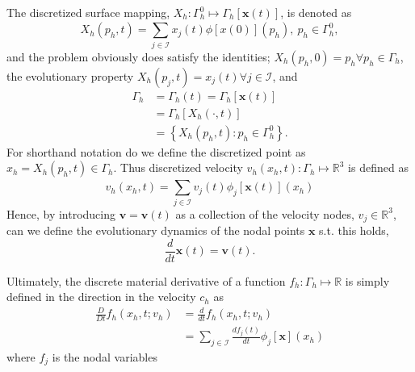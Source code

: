 The discretized surface mapping, $X_{h}: \Gamma_{h} ^{0} \mapsto  \Gamma _{h} \left[ \mathbf{x}\left( t \right)  \right] $, is denoted as \[
X_{h}\left( p_{h},t \right) = \sum_{j \in \mathcal{I} }^{}  x_{j}\left( t \right)  \phi \left[ x\left( 0 \right)  \right] \left( p_{h} \right), \  p_{h} \in \Gamma ^{0}_{h},
\]
and the problem obviously does satisfy the identities; $X_{h}\left( p_{h},0 \right)  = p_{h} \forall p_{h} \in \Gamma _{h}$, the evolutionary property $X_{h} \left( p_{j}, t \right)  = x_{j}\left( t \right)  \forall j \in \mathcal{I} $, and
\[
    \begin{split}
        \Gamma _{h} & = \Gamma_{h} \left( t \right) =   \Gamma_{h} \left[ \mathbf{x}\left( t \right)  \right]  \\
                                    &= \Gamma_{h}\left[ X_{h}\left( \cdot ,t \right)  \right] \\
&=\left\{ X_{h}\left( p_{h},t \right): p_{h} \in  \Gamma ^{0}_{h} \right\}.
    \end{split}
\]
For shorthand notation do we define the discretized point as $x_{h} = X_{h}\left( p_{h},t \right) \in \Gamma _{h} $.
Thus discretized velocity $v_{h}\left( x_{h},t \right): \Gamma _{h} \mapsto  \mathbb{R} ^{3} $ is defined as \[
    v_{h}\left( x_{h},t \right)  = \sum_{j \in \mathcal{I} }^{} v_{j}\left( t \right) \phi _{j}\left[ \mathbf{x}\left( t \right)  \right] \left( x_{h} \right)
\]
Hence, by introducing  $\mathbf{v} = \mathbf{v}\left( t \right)  $ as a collection of the velocity nodes,  $v_{j} \in \mathbb{R} ^3$, can we define the evolutionary dynamics of the nodal points $\mathbf{x}$ s.t. this holds,
\[
\frac{d}{dt}\mathbf{x}\left( t \right) = \mathbf{v}\left( t \right).
\]

Ultimately, the discrete material derivative of a function $f_{h}: \Gamma _{h} \mapsto  \mathbb{R} $ is simply defined in the direction in the velocity $c_{h}$  as \[
    \begin{split}
\frac{D}{Dt}f_{h}\left( x_{h}, t; v_{h}   \right) & = \frac{d}{dt} f_{h}\left( x_{h}, t; v_{h}   \right) \\
 & = \sum_{j \in \mathcal{I} }^{} \frac{d f_{j} \left( t \right) }{dt} \phi _{j}\left[ \mathbf{x} \right] \left( x_{h} \right)
    \end{split}
\]
where $f_{j}$ is the nodal variables

